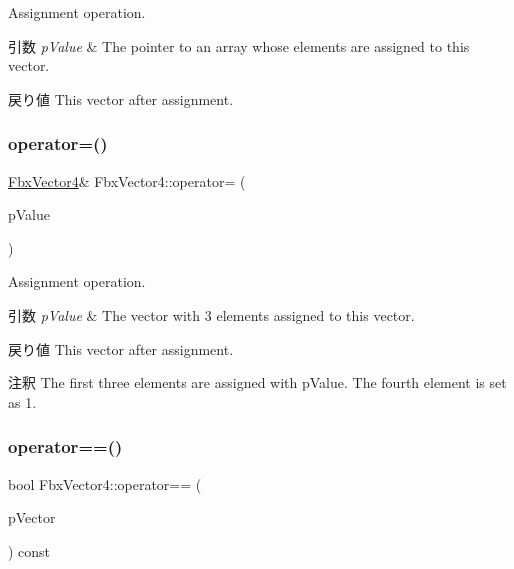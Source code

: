 Assignment operation. 
\begin{DoxyParams}{引数}
{\em p\+Value} & The pointer to an array whose elements are assigned to this vector. \\
\hline
\end{DoxyParams}
\begin{DoxyReturn}{戻り値}
This vector after assignment. 
\end{DoxyReturn}
\mbox{\label{class_fbx_vector4_afd3267e501ae3b8932d2a1c6a3ee378a}} 
\subsubsection{\texorpdfstring{operator=()}{operator=()}\hspace{0.1cm}{\footnotesize\ttfamily [3/3]}}
{\footnotesize\ttfamily \hyperlink{class_fbx_vector4}{Fbx\+Vector4}\& Fbx\+Vector4\+::operator= (\begin{DoxyParamCaption}\item[{const \hyperlink{fbxtypes_8h_ae0a96f14cde566774c7553aa7523b7a7}{Fbx\+Double3} \&}]{p\+Value }\end{DoxyParamCaption})}

Assignment operation. 
\begin{DoxyParams}{引数}
{\em p\+Value} & The vector with 3 elements assigned to this vector. \\
\hline
\end{DoxyParams}
\begin{DoxyReturn}{戻り値}
This vector after assignment. 
\end{DoxyReturn}
\begin{DoxyRemark}{注釈}
The first three elements are assigned with p\+Value. The fourth element is set as 1. 
\end{DoxyRemark}
\mbox{\label{class_fbx_vector4_a25462c5cdd200b19ad30e0ab4a7eac44}} 
\subsubsection{\texorpdfstring{operator==()}{operator==()}}
{\footnotesize\ttfamily bool Fbx\+Vector4\+::operator== (\begin{DoxyParamCaption}\item[{const \hyperlink{class_fbx_vector4}{Fbx\+Vector4} \&}]{p\+Vector }\end{DoxyParamCaption}) const}

